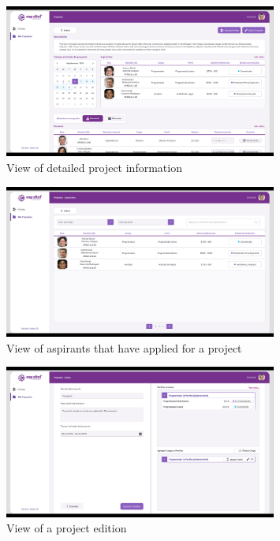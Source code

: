 \documentclass{scrreprt}
\begin{document}
\begin{figure}[H]
	\centering \small
	\includegraphics[width=0.8\textwidth]{WebPrototype/wflow-13.jpeg}
	\caption{View of detailed project information}
\end{figure}

\begin{figure}[H]
	\centering \small
	\includegraphics[width=0.8\textwidth]{WebPrototype/wflow-14.jpeg}
	\caption{View of aspirants that have applied for a project}
\end{figure}

\begin{figure}[H]
	\centering \small
	\includegraphics[width=0.8\textwidth]{WebPrototype/wflow-15.jpeg}
	\caption{View of a project edition}
\end{figure}
\end{document}
